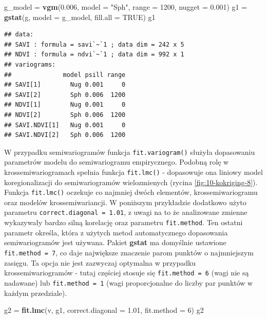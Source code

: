 \documentclass[
  paper=6in:9in,pagesize=pdftex,headinclude=on,footinclude=on,10pt]{scrbook}
\newenvironment{Shaded}{\begin{snugshade}}{\end{snugshade}}
\newcommand{\AttributeTok}[1]{\textcolor[rgb]{0.13,0.29,0.53}{#1}}
\newcommand{\ConstantTok}[1]{\textcolor[rgb]{0.56,0.35,0.01}{#1}}
\newcommand{\DecValTok}[1]{\textcolor[rgb]{0.00,0.00,0.81}{#1}}
\newcommand{\FloatTok}[1]{\textcolor[rgb]{0.00,0.00,0.81}{#1}}
\newcommand{\FunctionTok}[1]{\textcolor[rgb]{0.13,0.29,0.53}{\textbf{#1}}}
\newcommand{\NormalTok}[1]{#1}
\newcommand{\OtherTok}[1]{\textcolor[rgb]{0.56,0.35,0.01}{#1}}
\newcommand{\StringTok}[1]{\textcolor[rgb]{0.31,0.60,0.02}{#1}}
\begin{document}
\begin{Shaded}
\begin{Highlighting}[]
\NormalTok{g\_model }\OtherTok{=} \FunctionTok{vgm}\NormalTok{(}\FloatTok{0.006}\NormalTok{, }\AttributeTok{model =} \StringTok{"Sph"}\NormalTok{,}
              \AttributeTok{range =} \DecValTok{1200}\NormalTok{, }\AttributeTok{nugget =} \FloatTok{0.001}\NormalTok{)}
\NormalTok{g1 }\OtherTok{=} \FunctionTok{gstat}\NormalTok{(g, }\AttributeTok{model =}\NormalTok{ g\_model, }\AttributeTok{fill.all =} \ConstantTok{TRUE}\NormalTok{)}
\NormalTok{g1}
\end{Highlighting}
\end{Shaded}

\begin{verbatim}
## data:
## SAVI : formula = savi`~`1 ; data dim = 242 x 5
## NDVI : formula = ndvi`~`1 ; data dim = 992 x 1
## variograms:
##              model psill range
## SAVI[1]        Nug 0.001     0
## SAVI[2]        Sph 0.006  1200
## NDVI[1]        Nug 0.001     0
## NDVI[2]        Sph 0.006  1200
## SAVI.NDVI[1]   Nug 0.001     0
## SAVI.NDVI[2]   Sph 0.006  1200
\end{verbatim}

W przypadku semiwariogramów funkcja \texttt{fit.variogram()} służyła dopasowaniu parametrów modelu do semiwariogramu empirycznego.
Podobną rolę w krossemiwariogramach spełnia funkcja \texttt{fit.lmc()} - dopasowuje ona liniowy model koregionalizacji do semiwariogramów wielozmienych (rycina \ref{fig:10-kokriging-8}).
Funkcja \texttt{fit.lmc()} oczekuje co najmniej dwóch elementów, krossemiwariogramu oraz modelów krossemiwariancji.
W poniższym przykładzie dodatkowo użyto parametru \texttt{correct.diagonal\ =\ 1.01}, z uwagi na to że analizowane zmienne wykazywały bardzo silną korelację oraz parametru \texttt{fit.method}.
Ten ostatni parametr określa, która z użytych metod automatycznego dopasowania semiwariogramów jest używana.
Pakiet \textbf{gstat} ma domyślnie ustawione \texttt{fit.method\ =\ 7}, co daje największe znaczenie parom punktów o najmniejszym zasięgu.
Ta opcja nie jest zazwyczaj optymalna w przypadku krossemiwariogramów - tutaj częściej stosuje się \texttt{fit.method\ =\ 6} (wagi nie są nadawane) lub \texttt{fit.method\ =\ 1} (wagi proporcjonalne do liczby par punktów w każdym przedziale).

\begin{Shaded}
\begin{Highlighting}[]
\NormalTok{g2 }\OtherTok{=} \FunctionTok{fit.lmc}\NormalTok{(v, g1,}
                \AttributeTok{correct.diagonal =} \FloatTok{1.01}\NormalTok{,}
                \AttributeTok{fit.method =} \DecValTok{6}\NormalTok{)}
\NormalTok{g2}
\end{Highlighting}
\end{Shaded}
\end{document}
